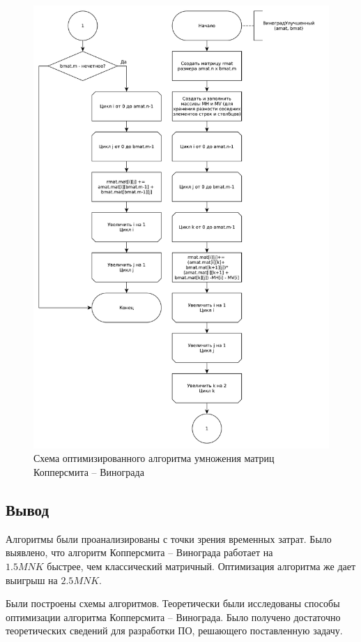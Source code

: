 \begin{figure}[ht!]
	\centering
	\includegraphics[width=0.95\linewidth]{assets/mtx-win2.pdf}
	\caption{Схема оптимизированного алгоритма умножения матриц Копперсмита -- Винограда}
	\label{fig:win-2}
\end{figure}


\subsection{Вывод}
Алгоритмы были проанализированы с точки зрения временных затрат. Было выявлено, что алгоритм Копперсмита -- Винограда работает на \\ $1.5MNK$ быстрее, чем классический матричный. Оптимизация алгоритма же дает выигрыш на $2.5MNK$. 


Были построены схемы алгоритмов. Теоретически были исследованы способы оптимизации алгоритма Копперсмита -- Винограда. Было получено достаточно теоретических сведений для разработки ПО, решающего поставленную задачу.